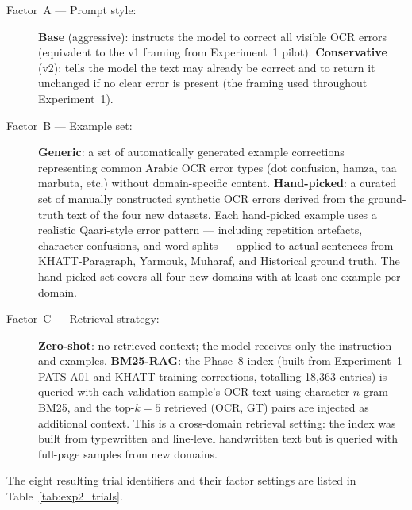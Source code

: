 \begin{description}
  \item[Factor~A --- Prompt style:]
    \textbf{Base} (aggressive): instructs the model to correct all visible
    OCR errors (equivalent to the v1 framing from Experiment~1 pilot).
    \textbf{Conservative} (v2): tells the model the text may already be
    correct and to return it unchanged if no clear error is present
    (the framing used throughout Experiment~1).

  \item[Factor~B --- Example set:]
    \textbf{Generic}: a set of automatically generated example corrections
    representing common Arabic OCR error types (dot confusion, hamza,
    taa marbuta, etc.) without domain-specific content.
    \textbf{Hand-picked}: a curated set of manually constructed synthetic
    OCR errors derived from the ground-truth text of the four new datasets.
    Each hand-picked example uses a realistic Qaari-style error pattern ---
    including repetition artefacts, character confusions, and word splits ---
    applied to actual sentences from KHATT-Paragraph, Yarmouk, Muharaf,
    and Historical ground truth. The hand-picked set covers all four new
    domains with at least one example per domain.

  \item[Factor~C --- Retrieval strategy:]
    \textbf{Zero-shot}: no retrieved context; the model receives only the
    instruction and examples.
    \textbf{BM25-RAG}: the Phase~8 index (built from Experiment~1
    PATS-A01 and KHATT training corrections, totalling 18,363 entries) is
    queried with each validation sample's OCR text using character $n$-gram
    BM25, and the top-$k=5$ retrieved (OCR, GT) pairs are injected as
    additional context. This is a cross-domain retrieval setting: the index
    was built from typewritten and line-level handwritten text but is queried
    with full-page samples from new domains.
\end{description}

The eight resulting trial identifiers and their factor settings are listed
in Table~\ref{tab:exp2_trials}.

